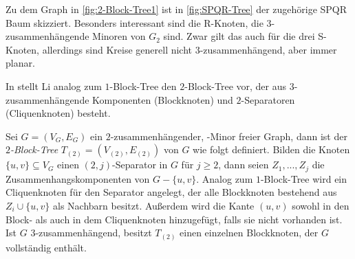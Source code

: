 Zu dem Graph in \Abb \ref{fig:2-Block-Tree1} ist in \Abb \ref{fig:SPQR-Tree} der zugehörige SPQR Baum skizziert.
Besonders interessant sind die R-Knoten, die $3$-zusammenhängende Minoren von $G_2$ sind.
Zwar gilt das auch für die drei S-Knoten, allerdings sind Kreise generell nicht $3$-zusammenhängend, aber immer planar.

In \cite{Li11} stellt Li analog zum $1$-Block-Tree den $2$-Block-Tree vor, der aus $3$-zusammenhängende Komponenten (Blockknoten) und $2$-Separatoren (Cliquenknoten) besteht.

\begin{definition}
  Sei $G = (V_G, E_G)$ ein $2$-zusammenhängender, \kf-Minor freier Graph, dann ist der \emph{$2$-Block-Tree} $T_{(2)} = (V_{(2)}, E_{(2)})$ von $G$ wie folgt definiert.
  Bilden die Knoten $\{u, v\} \subseteq V_G$ einen $(2, j)$-Separator in $G$ für $j \geq 2$, dann seien $Z_1, ..., Z_j$ die Zusammenhangskomponenten von $G - \{u, v\}$.
  Analog zum $1$-Block-Tree wird ein Cliquenknoten für den Separator angelegt, der alle Blockknoten bestehend aus $Z_i \cup \{u, v\}$ als Nachbarn besitzt.
  Außerdem wird die Kante $(u, v)$ sowohl in den Block- als auch in dem Cliquenknoten hinzugefügt, falls sie nicht vorhanden ist.
  Ist $G$ $3$-zusammenhängend, besitzt $T_{(2)}$ einen einzelnen Blockknoten, der $G$ vollständig enthält.
\end{definition}

